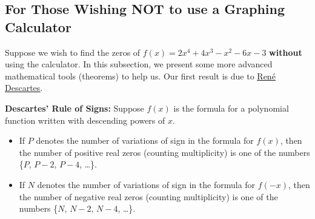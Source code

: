 \documentclass{ximera}
\begin{document}
\subsection{For Those Wishing NOT to use a Graphing Calculator}

Suppose we wish to find the zeros of $f(x) = 2x^4+4x^3-x^2-6x-3$ \textbf{without} using the calculator.  In this subsection, we present some more advanced mathematical tools (theorems) to help us.  Our first result is due to \href{http://en.wikipedia.org/wiki/Descartes}{\underline{Ren\'{e} Descartes}}.

\smallskip


\begin{theorem} \label{DRS}  \textbf{Descartes' Rule of Signs:}  Suppose $f(x)$ is the formula for a polynomial function written with descending powers of $x$.

\begin{itemize}

\item If $P$ denotes the number of variations of sign in the formula for $f(x)$, then the number of positive real zeros (counting multiplicity) is one of the numbers \{$P$, $P-2$, $P-4$, \ldots \}.

\item If $N$ denotes the number of variations of sign in the formula for $f(-x)$, then the number of negative real zeros (counting multiplicity) is one of the numbers \{$N$, $N-2$, $N-4$, \dots\}.

\end{itemize}

\end{theorem}

\smallskip
\end{document}
